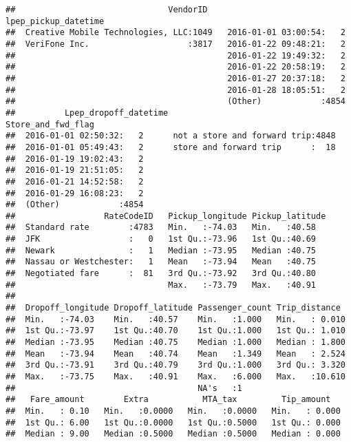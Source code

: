 \documentclass[]{article}
\begin{document}
\begin{verbatim}
##                               VendorID             lpep_pickup_datetime
##  Creative Mobile Technologies, LLC:1049   2016-01-01 03:00:54:   2     
##  VeriFone Inc.                    :3817   2016-01-22 09:48:21:   2     
##                                           2016-01-22 19:49:32:   2     
##                                           2016-01-22 20:58:19:   2     
##                                           2016-01-27 20:37:18:   2     
##                                           2016-01-28 18:05:51:   2     
##                                           (Other)            :4854     
##          Lpep_dropoff_datetime                    Store_and_fwd_flag
##  2016-01-01 02:50:32:   2      not a store and forward trip:4848    
##  2016-01-01 05:49:43:   2      store and forward trip      :  18    
##  2016-01-19 19:02:43:   2                                           
##  2016-01-19 21:51:05:   2                                           
##  2016-01-21 14:52:58:   2                                           
##  2016-01-29 16:08:23:   2                                           
##  (Other)            :4854                                           
##                  RateCodeID   Pickup_longitude Pickup_latitude
##  Standard rate        :4783   Min.   :-74.03   Min.   :40.58  
##  JFK                  :   0   1st Qu.:-73.96   1st Qu.:40.69  
##  Newark               :   1   Median :-73.95   Median :40.75  
##  Nassau or Westchester:   1   Mean   :-73.94   Mean   :40.75  
##  Negotiated fare      :  81   3rd Qu.:-73.92   3rd Qu.:40.80  
##                               Max.   :-73.79   Max.   :40.91  
##                                                               
##  Dropoff_longitude Dropoff_latitude Passenger_count Trip_distance   
##  Min.   :-74.03    Min.   :40.57    Min.   :1.000   Min.   : 0.010  
##  1st Qu.:-73.97    1st Qu.:40.70    1st Qu.:1.000   1st Qu.: 1.010  
##  Median :-73.95    Median :40.75    Median :1.000   Median : 1.800  
##  Mean   :-73.94    Mean   :40.74    Mean   :1.349   Mean   : 2.524  
##  3rd Qu.:-73.91    3rd Qu.:40.79    3rd Qu.:1.000   3rd Qu.: 3.320  
##  Max.   :-73.75    Max.   :40.91    Max.   :6.000   Max.   :10.610  
##                                     NA's   :1                       
##   Fare_amount        Extra           MTA_tax         Tip_amount    
##  Min.   : 0.10   Min.   :0.0000   Min.   :0.0000   Min.   : 0.000  
##  1st Qu.: 6.00   1st Qu.:0.0000   1st Qu.:0.5000   1st Qu.: 0.000  
##  Median : 9.00   Median :0.5000   Median :0.5000   Median : 0.000  

\end{verbatim}
\end{document}
